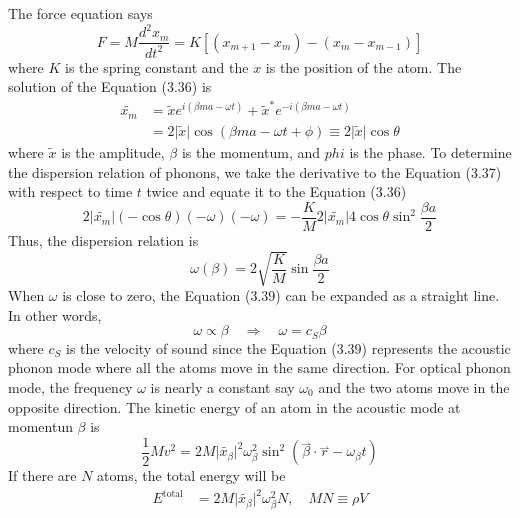 The force equation says \begin{equation}
    F = M\frac{d^{2}x_{m}}{dt^{2}} = K\left[(x_{m+1}-x_{m})-(x_{m}-x_{m-1})\right]
\end{equation} where $K$ is the spring constant and the $x$ is the position of the atom. The solution of the Equation (3.36) is \begin{align}
    \widetilde{x_{m}}& = \widetilde{x}e^{i(\beta ma - \omega t)} + \widetilde{x}^{*}e^{-i(\beta ma - \omega t)}\nonumber\\
    & = 2\big|\widetilde{x}\big|\cos{(\beta ma - \omega t + \phi)} \equiv 2\big|\widetilde{x}\big|\cos{\theta}
\end{align} where $\widetilde{x}$ is the amplitude, $\beta$ is the momentum, and $phi$ is the phase. To determine the dispersion relation of phonons, we take the derivative to the Equation (3.37) with respect to time $t$ twice and equate it to the Equation (3.36) \begin{equation}
    2\big|\widetilde{x_{m}}\big|(-\cos{\theta})(-\omega)(-\omega) = -\frac{K}{M}2\big|\widetilde{x_{m}}\big|4\cos{\theta}\sin^{2}{\frac{\beta a}{2}}
\end{equation} Thus, the dispersion relation is \begin{equation}
    \boxed{\omega(\beta) = 2\sqrt{\frac{K}{M}}\sin{\frac{\beta a}{2}}}
\end{equation} When $\omega$ is close to zero, the Equation (3.39) can be expanded as a straight line. In other words, \begin{equation}
    \omega \propto \beta \quad \Rightarrow \quad \omega = c_{S}\beta
\end{equation} where $c_{S}$ is the velocity of sound since the Equation (3.39) represents the acoustic phonon mode where all the atoms move in the same direction. For optical phonon mode, the frequency $\omega$ is nearly a constant say $\omega_{0}$ and the two atoms move in the opposite direction. The kinetic energy of an atom in the acoustic mode at momentun $\beta$ is \begin{equation}
    \frac{1}{2}Mv^{2} = 2M\big|\widetilde{x_{\beta}}\big|^{2}\omega_{\beta}^{2}\sin^{2}{(\overset{\rightharpoonup}{\beta}\cdot\overset{\rightharpoonup}{r}-\omega_{\beta}t)}
\end{equation} If there are $N$ atoms, the total energy will be \begin{align}
    E^{\text{total}}& = 2M\big|\widetilde{x_{\beta}}\big|^{2}\omega_{\beta}^{2}N,\quad MN\equiv \rho V \nonumber\\

\end{align}
